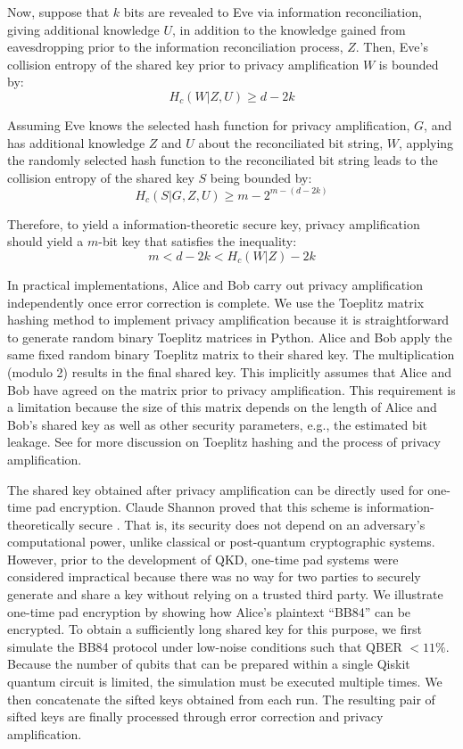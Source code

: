 Now, suppose that $k$ bits are revealed to Eve via information reconciliation, giving additional knowledge $U$, in addition to the knowledge gained from eavesdropping prior to the information reconciliation process, $Z$. Then, Eve's collision entropy of the shared key prior to privacy amplification $W$ is bounded by:
\begin{equation*}
    H_c(W|Z,U) \ge d - 2 k 
\end{equation*}

Assuming Eve knows the selected hash function for privacy amplification, $G$, and has additional knowledge $Z$ and $U$ about the reconciliated bit string, $W$, applying the randomly selected hash function to the reconciliated bit string leads to the collision entropy of the shared key $S$ being bounded by:
\begin{equation*}
    H_c(S|G,Z,U) \ge m - 2^{m - (d - 2k)}
\end{equation*}

Therefore, to yield a information-theoretic secure key, privacy amplification should yield a $m$-bit key that satisfies the inequality:
\begin{equation*}
    m < d - 2 k < H_c(W|Z) - 2 k
\end{equation*}

In practical implementations, Alice and Bob carry out privacy amplification independently once error correction is complete. 
We use the Toeplitz matrix hashing method to implement privacy amplification because it is straightforward to generate random binary Toeplitz matrices in Python.
Alice and Bob apply the same fixed random binary Toeplitz matrix to their shared key. The multiplication (modulo 2) results in the final shared key. This implicitly assumes that Alice and Bob have agreed on the matrix prior to privacy amplification. 
This requirement is a limitation because the size of this matrix depends on the length of Alice and Bob's shared key as well as other security parameters, e.g., the estimated bit leakage. 
See \cite{doi:10.1137/0217014, vanAssche2010} for more discussion on Toeplitz hashing and the process of privacy amplification. 

The shared key obtained after privacy amplification can be directly used for one-time pad encryption. Claude Shannon proved that this scheme is information-theoretically secure \cite{shannon1949secrecy}. That is, its security does not depend on an adversary’s computational power, unlike classical or post-quantum cryptographic systems. 
However, prior to the development of QKD, one-time pad systems were considered impractical because there was no way for two parties to securely generate and share a key without relying on a trusted third party. 
We illustrate one-time pad encryption by showing how Alice’s plaintext “BB84” can be encrypted. To obtain a sufficiently long shared key for this purpose, we first simulate the BB84 protocol under low-noise conditions such that QBER $< 11\%$.
Because the number of qubits that can be prepared within a single Qiskit quantum circuit is limited, the simulation must be executed multiple times. 
We then concatenate the sifted keys obtained from each run. The resulting pair of sifted keys are finally processed through error correction and privacy amplification.
